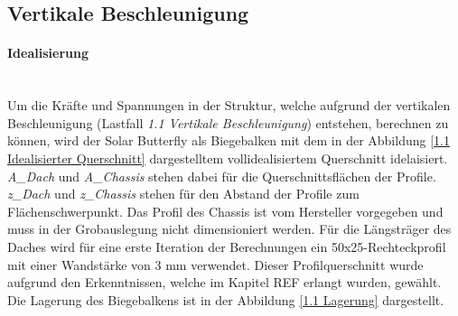 \subsection{Vertikale Beschleunigung}
\label{1.1 Vertikale Beschleunigung}
  \paragraph{Idealisierung}\mbox{}\\
  Um die Kräfte und Spannungen in der Struktur, welche aufgrund der vertikalen Beschleunigung (Lastfall \emph{1.1 Vertikale Beschleunigung}) entstehen, berechnen zu können, wird der Solar Butterfly als Biegebalken mit dem in der Abbildung \ref{1.1 Idealisierter Querschnitt} dargestelltem vollidealisiertem Querschnitt idelaisiert. \emph{A\_Dach} und \emph{A\_Chassis} stehen dabei für die Querschnittsflächen der Profile. \emph{z\_Dach} und \emph{z\_Chassis} stehen für den Abstand der Profile zum Flächenschwerpunkt. Das Profil des Chassis ist vom Hersteller vorgegeben und muss in der Grobauslegung nicht dimensioniert werden. Für die Längsträger des Daches wird für eine erste Iteration der Berechnungen ein 50x25-Rechteckprofil mit einer Wandstärke von 3 mm verwendet. Dieser Profilquerschnitt wurde aufgrund den Erkenntnissen, welche im Kapitel REF erlangt wurden, gewählt. Die Lagerung des Biegebalkens ist in der Abbildung \ref{1.1 Lagerung} dargestellt.

